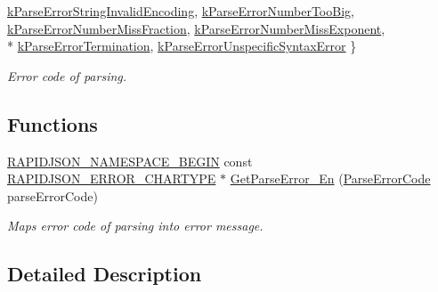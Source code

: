 \begin{DoxyCompactItemize}
\hyperlink{group___r_a_p_i_d_j_s_o_n___e_r_r_o_r_s_gga8d4b32dfc45840bca189ade2bbcb6ba7a17ecb2ed1524b513d64a93f4a7a8b456}{k\+Parse\+Error\+String\+Invalid\+Encoding}, 
\hyperlink{group___r_a_p_i_d_j_s_o_n___e_r_r_o_r_s_gga8d4b32dfc45840bca189ade2bbcb6ba7ae52aaa70fde46e4cc422420309700b82}{k\+Parse\+Error\+Number\+Too\+Big}, 
\hyperlink{group___r_a_p_i_d_j_s_o_n___e_r_r_o_r_s_gga8d4b32dfc45840bca189ade2bbcb6ba7a08a2cc2b4cacfba1673ed536eee229ce}{k\+Parse\+Error\+Number\+Miss\+Fraction}, 
\hyperlink{group___r_a_p_i_d_j_s_o_n___e_r_r_o_r_s_gga8d4b32dfc45840bca189ade2bbcb6ba7a82cdbd740e22b819a70d05e585c2a442}{k\+Parse\+Error\+Number\+Miss\+Exponent}, 
\\*
\hyperlink{group___r_a_p_i_d_j_s_o_n___e_r_r_o_r_s_gga8d4b32dfc45840bca189ade2bbcb6ba7a6fed2d9a15f88540a1ba785f0de2cbe6}{k\+Parse\+Error\+Termination}, 
\hyperlink{group___r_a_p_i_d_j_s_o_n___e_r_r_o_r_s_gga8d4b32dfc45840bca189ade2bbcb6ba7a2bec6b26bddd3e093a37fc0d6399e0be}{k\+Parse\+Error\+Unspecific\+Syntax\+Error}
 \}
\begin{DoxyCompactList}\small\item\em Error code of parsing. \end{DoxyCompactList}\end{DoxyCompactItemize}
\subsection*{Functions}
\begin{DoxyCompactItemize}
\item 
\hyperlink{group___r_a_p_i_d_j_s_o_n___c_o_n_f_i_g_gad3806c8251fdc7da9618b7e922674ffc}{R\+A\+P\+I\+D\+J\+S\+O\+N\+\_\+\+N\+A\+M\+E\+S\+P\+A\+C\+E\+\_\+\+B\+E\+G\+I\+N} const \hyperlink{group___r_a_p_i_d_j_s_o_n___e_r_r_o_r_s_ga7e4636fd48d0148f102b8a13f0539d8c}{R\+A\+P\+I\+D\+J\+S\+O\+N\+\_\+\+E\+R\+R\+O\+R\+\_\+\+C\+H\+A\+R\+T\+Y\+P\+E} $\ast$ \hyperlink{group___r_a_p_i_d_j_s_o_n___e_r_r_o_r_s_ga755b523205f46c980c80d12e230a3abd}{Get\+Parse\+Error\+\_\+\+En} (\hyperlink{group___r_a_p_i_d_j_s_o_n___e_r_r_o_r_s_ga8d4b32dfc45840bca189ade2bbcb6ba7}{Parse\+Error\+Code} parse\+Error\+Code)
\begin{DoxyCompactList}\small\item\em Maps error code of parsing into error message. \end{DoxyCompactList}\end{DoxyCompactItemize}


\subsection{Detailed Description}


